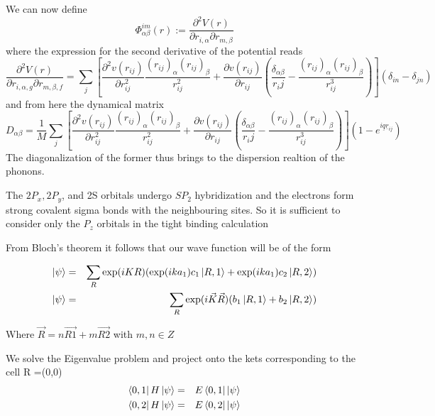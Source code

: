 \documentclass[a4paper]{article}
\begin{document}
        
        We can now define 
        \begin{equation}
            \Phi_{\alpha\beta}^{im}(r):=\frac{\partial^2 V(r)}{\partial r_{i,\alpha}\partial r_{m,\beta}}
        \end{equation}
        where the expression for the second derivative of the potential reads
        \begin{equation*}
            \frac{\partial^2 V(r)}{\partial r_{i,\alpha,g}\partial r_{m,\beta,f}} = \sum_j\left[\frac{\partial^2 v(r_{ij})}{\partial r_{ij}^2}\frac{(r_{ij})_{\alpha}(r_{ij})_{\beta}}{r_{ij}^2} + \frac{\partial v(r_{ij})}{\partial r_{ij}}\left(\frac{\delta_{\alpha\beta}}{r_ij}-\frac{(r_{ij})_{\alpha}(r_{ij})_{\beta}}{r_{ij}^3}\right)\right](\delta_{in}-\delta_{jn})
        \end{equation*}
        and from here the dynamical matrix
        \begin{equation}
            D_{\alpha\beta} = \frac{1}{M}\sum_j\left[\frac{\partial^2 v(r_{ij})}{\partial r_{ij}^2}\frac{(r_{ij})_{\alpha}(r_{ij})_{\beta}}{r_{ij}^2} + \frac{\partial v(r_{ij})}{\partial r_{ij}}\left(\frac{\delta_{\alpha\beta}}{r_ij}-\frac{(r_{ij})_{\alpha}(r_{ij})_{\beta}}{r_{ij}^3}\right)\right]\left(1-e^{i\underline{q}\underline{r}_{ij}}\right)
        \end{equation}
        The diagonalization of the former thus brings to the dispersion realtion of the phonons.
    

The $2P_{x}, 2P_{y}$, and 2S orbitals undergo $SP_{2}$ hybridization and the electrons form strong covalent sigma bonds with the neighbouring sites. So it is sufficient to consider only the $P_{z}$ orbitals in the tight binding calculation

From Bloch's theorem it follows that our wave function will be of the form

\begin{eqnarray}
    \ket{\psi}&=&\sum_{R}\exp(iKR)(\exp(ika_{1})c_{1}\ket{R,1} + \exp(ika_{1})c_{2}\ket{R,2} )\\
	\ket{\psi}&=&\sum_{R}\exp(i\vec{K}\vec{R})(b_{1}\ket{R,1} + b_{2}\ket{R,2} )
\end{eqnarray}


Where $\vec{R} = n\vec{R1} + m\vec{R2} $  with $m,n \in Z$


We solve the Eigenvalue problem and project onto the kets corresponding to the cell R =(0,0) 
\begin{eqnarray}
\bra{0,1}H\ket{\psi}&=&E\bra{0,1}\ket{\psi}\\
\bra{0,2}H\ket{\psi}&=&E\bra{0,2}\ket{\psi}
\end{eqnarray}
\end{document}
